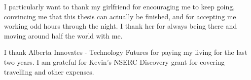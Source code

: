 I particularly want to thank my girlfriend for encouraging me to keep going,
convincing me that this thesis can actually be finished, and for accepting me
working odd hours through the night. I thank her for always being there and
moving around half the world with me.

I thank Alberta Innovates - Technology Futures for paying my living for the
last two years. I am grateful for Kevin's NSERC Discovery grant for covering
travelling and other expenses.



%
%
%

